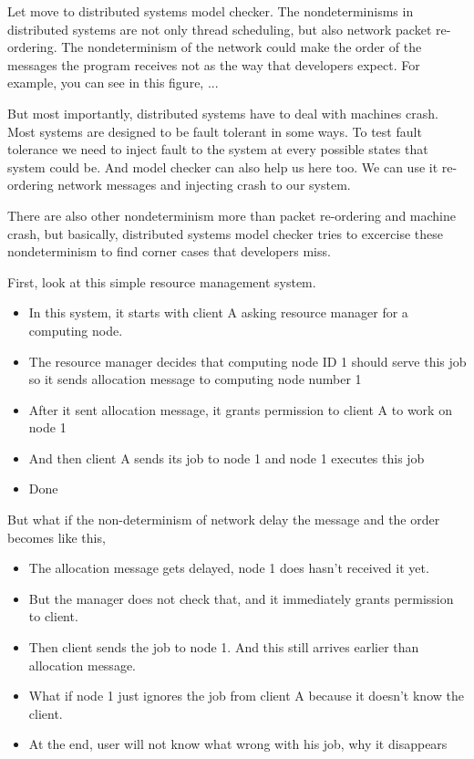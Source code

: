 
\if
Let move to distributed systems model checker. The nondeterminisms in
distributed systems are not only thread scheduling, but also network packet
re-ordering. The nondeterminism of the network could make the order of the
messages the program receives not as the way that developers expect. For
example, you can see in this figure, ...
\fi

But most importantly, distributed systems have to deal with machines crash.
Most systems are designed to be fault tolerant in some ways. To test fault
tolerance we need to inject fault to the system at every possible states that
system could be. And model checker can also help us here too. We can use it
re-ordering network messages and injecting crash to our system.
\fi

There are also other nondeterminism more than packet re-ordering and machine
crash, but basically, distributed systems model checker tries to excercise these
nondeterminism to find corner cases that developers miss.

First, look at this simple resource management system. 

\begin{itemize}

\item In this system, it starts with client A asking resource manager for a
computing node.

\item The resource manager decides that computing node ID 1 should serve this
job so it sends allocation message to computing node number 1 

\item After it sent allocation message, it grants permission to client A to work
on node 1

\item And then client A sends its job to node 1 and node 1 executes this job

\item Done

\end{itemize}

But what if the non-determinism of network delay the message and the order
becomes like this,

\begin{itemize}

\item The allocation message gets delayed, node 1 does hasn't received it yet.

\item But the manager does not check that, and it immediately grants permission
to client.

\item Then client sends the job to node 1. And this still arrives earlier than
allocation message.

\item What if node 1 just ignores the job from client A because it doesn't know
the client.

\item At the end, user will not know what wrong with his job, why it disappears

\end{itemize}

